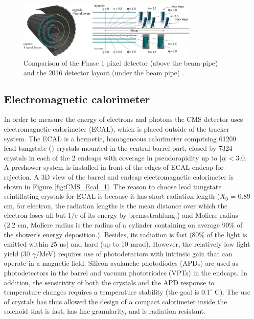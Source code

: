 \begin{figure}[h!]
\begin{center}
\includegraphics[width=0.8\textwidth]{figures/CMS/tracker/pixel_phase1_update.png}
\caption{Comparison of the Phase 1 pixel detector (above the beam pipe) and the 2016 detector layout (under the beam pipe) \cite{Chatrchyan:2008aa}.}
\label{fig:CMS_pixel_update}
\end{center}
\end{figure}

\subsection{Electromagnetic calorimeter}\label{subsec:CMS_ECAL}
In order to measure the energy of electrons and photons the CMS detector uses electromagnetic calorimeter (ECAL), which is placed outside of the tracker system. The ECAL is a hermetic, homogeneous calorimeter comprising 61200 lead tungstate (\PbWO) crystals mounted in the central barrel part, closed by 7324 crystals in each of the 2 endcaps with coverage in pseudorapidity up to $|\eta| < 3.0$. A preshower system is installed in front of the edges of ECAL endcap for \pizero rejection. A 3D view of the barrel and endcap electromagnetic calorimeter is shown in Figure \ref{fig:CMS_Ecal_1}. The reason to choose lead tungstate scintillating crystals for ECAL is because it has short radiation length ($X_{0}$ = 0.89 cm, for electron, the radiation lengths is the mean distance over which the electron loses all but 1/e of its energy by bremsstrahlung.) and Moliere radius (2.2 cm, Moliere radius is the radius of a cylinder containing on average 90\% of the shower's energy deposition.).
Besides, its radiation is fast (80\% of the light is emitted within 25 ns) and hard (up to 10 mrad). However, the relatively low light yield (30 $\gamma$/MeV) requires use of photodetectors with intrinsic gain that can operate in a magnetic field. Silicon avalanche photodiodes (APDs) are used as photodetectors in the barrel and
vacuum phototriodes (VPTs) in the endcaps. In addition, the sensitivity of both the crystals and the APD response to temperature changes requires a temperature stability (the goal is
$0.1^{\circ}$ C). The use of \PbWO crystals has thus allowed the design of a compact calorimeter inside the solenoid that is fast, has fine granularity, and is radiation resistant.


